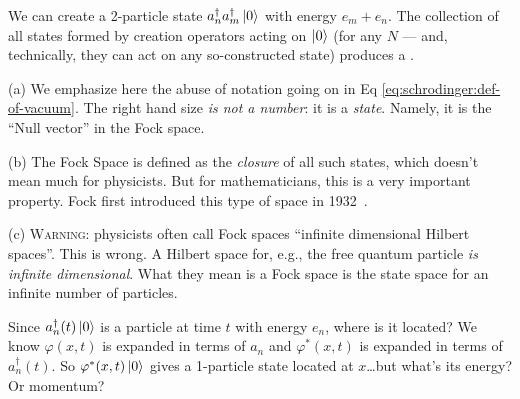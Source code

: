 \begin{defn}
We can create a 2-particle state
$a^{\dagger}_{n}a^{\dagger}_{m}\ket{0}$ with energy $e_{m}+e_{n}$. The
collection of all states formed by creation operators acting on
$\ket{0}$ (for any $N$ --- and, technically, they can act on any
so-constructed state) produces a .
\end{defn}

(a) We emphasize here the abuse of notation going on in Eq
\eqref{eq:schrodinger:def-of-vacuum}. The right hand size \emph{is not a
  number}: it is a \emph{state}. Namely, it is the ``Null vector'' in
the Fock space.

(b) The Fock Space is defined as the \emph{closure} of all such states,
which doesn't mean much for physicists. But for mathematicians, this is
a very important property. Fock first introduced this type of space in
1932~\cite{fock1932}. 

(c) \textsc{Warning:} physicists often call Fock spaces ``infinite
dimensional Hilbert spaces''. This is wrong. A Hilbert space for, e.g.,
the free quantum particle \emph{is infinite dimensional}. What they mean
is a Fock space is the state space for an infinite number of particles.

Since $a^{\dagger}_{n}(t)\ket{0}$ is a particle at time $t$ with
energy $e_{n}$, where is it located? We know $\varphi(x,t)$ is expanded
in terms of $a_{n}$ and $\varphi^{*}(x,t)$ is expanded in terms of
$a^{\dagger}_{n}(t)$. So $\varphi^{*}(x,t)\ket{0}$ gives a 1-particle
state located at $x$\dots but what's its energy? Or momentum?

